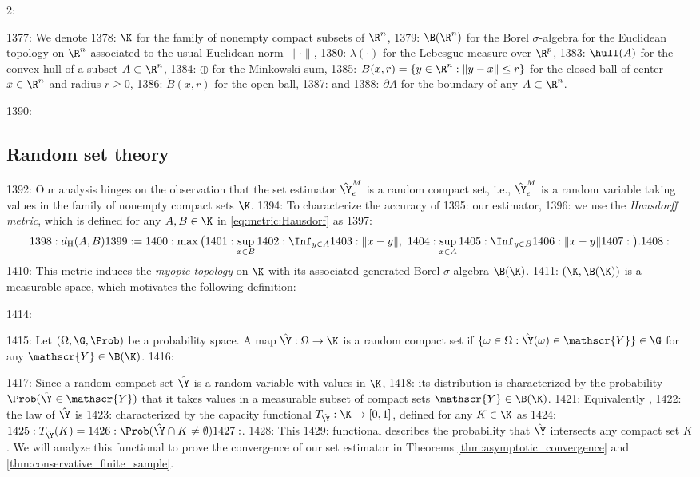 2: \documentclass[12pt]{l4dc2022} %
\begin{document}
1377: We denote 
1378:  $\K$ for the family of nonempty compact subsets of $\R^n$, 
1379: $\B(\R^n)$ for the Borel $\sigma$-algebra for the Euclidean topology on $\R^n$ associated to the usual Euclidean norm $\|\cdot\|$, 
1380: $\lambda(\cdot)$ for the Lebesgue measure over $\R^p$, 
1383: $\hull(A)$ for the convex hull of a subset $A\subset\R^n$, 
1384: $\oplus$ for the Minkowski sum, 
1385: $B(x,r)=\{y\in\R^n: \|y-x\|\leq r\}$ for the closed ball of center $x\in\R^n$ and radius $r\geq 0$, 
1386: $\mathring{B}(x,r)$ for the open ball,  
1387: and 
1388: $\partial A$ for the boundary of any $A\subset\R^n$. 

1390: \subsection{Random set theory}

1392: Our analysis hinges on the observation that the set estimator $\hat\Y_\epsilon^M$ is a random compact set, i.e., $\hat\Y_\epsilon^M$ is a random variable taking values in the family of nonempty compact sets $\K$.  
1394: To characterize the accuracy of
1395: our estimator,
1396: we use the \textit{Hausdorff metric}, which is defined for any $A,B\in\K$  in \eqref{eq:metric:Hausdorf} as 
1397: \begin{equation}%
1398: d_\textrm{H}(A,B)
1399: =
1400: \max\big(
1401: \sup_{x\in B}
1402: \Inf_{y\in A}
1403: \|x-y\|, \
1404: \sup_{x\in A}
1405: \Inf_{y\in B}
1406: \|x-y\|
1407: \big).
1408: \end{equation}
1410: This metric induces the \textit{myopic topology} on $\K$ \citep{Molchanov_BookTheoryOfRandomSets2017} with its associated generated Borel $\sigma$-algebra $\B(\K)$. 
1411: $(\K,\B(\K))$ is a measurable space, which motivates the following definition:

1414: \begin{definition}\label{def:random_compact_set}
1415: Let $(\Omega,\G,\Prob)$ be a probability space. A map $\hat\Y:\Omega\rightarrow\K$ is a random compact set if $\{\omega\in\Omega : \hat\Y(\omega)\in\mathscr{Y}\}\in\G$ for any $\mathscr{Y}\in\B(\K)$.
1416: \end{definition}
1417: Since a random compact set $\hat\Y$ is a random variable with values in $\K$, 
1418: its distribution is characterized by the probability $\Prob(\hat\Y\in\mathscr{Y})$ that it takes values in a measurable subset of compact sets  $\mathscr{Y}\in\B(\K)$. %
1421: Equivalently \citep{Molchanov_BookTheoryOfRandomSets2017}, %
1422: the law of $\hat\Y$ is %
1423: characterized by the capacity functional $T_{\hat\Y}:\K\rightarrow[0,1]$, defined for any $K\in\K$ as 
1424: $
1425: T_{\hat\Y}(K)=
1426: \Prob(\hat\Y \cap K\neq \emptyset)
1427: $. 
1428: This %
1429: functional describes the probability that $\hat\Y$ intersects any compact set $K$. We will analyze this functional to prove the convergence of our set estimator in Theorems \ref{thm:asymptotic_convergence} and \ref{thm:conservative_finite_sample}. 
\end{document}
